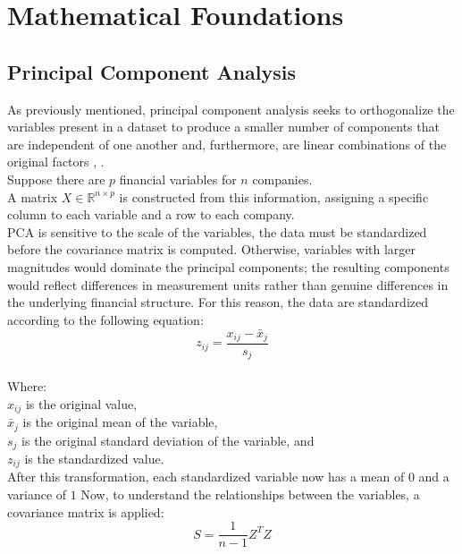 \documentclass[eng]{ajceam-class}
\begin{document}
\section{Mathematical Foundations}

\subsection{Principal Component Analysis}

As previously mentioned, principal component analysis seeks to orthogonalize the variables present in a dataset to produce a smaller number of components that are independent of one another and, furthermore, are linear combinations of the original factors \cite{almansoor2023}, \cite{greenacre2022}.\\

Suppose there are $p$ financial variables for $n$ companies.\\

A matrix $X \in \mathbb{R}^{n \times p}$ is constructed from this information, assigning a specific column to each variable and a row to each company.\\

PCA is sensitive to the scale of the variables, the data must be standardized before the covariance matrix is computed. Otherwise, variables with larger magnitudes would dominate the principal components; the resulting components would reflect differences in measurement units rather than genuine differences in the underlying financial structure. For this reason, the data are standardized according to the following equation:\\

{\large \[ z_{ij}=\frac{x_{ij}-\bar{x}_j}{s_j} \]}\\

Where:\\
$x_{ij}$ is the original value,\\
$\bar{x}_j$ is the original mean of the variable,\\
$s_j$ is the original standard deviation of the variable, and\\
$z_{ij}$ is the standardized value.\\

After this transformation, each standardized variable now has a mean of $0$ and a variance of $1$ Now, to understand the relationships between the variables, a covariance matrix is applied:\\

{\large \[ S=\frac{1}{n-1}Z^TZ \]}\\
\end{document}
